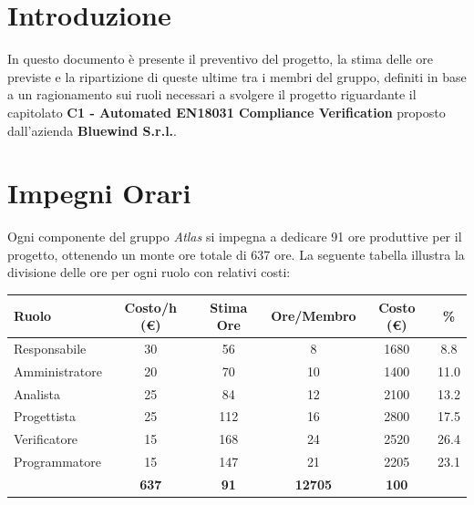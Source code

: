 \documentclass[a4paper,12pt]{article}
\begin{document}
\newpage

\tableofcontents

\newpage

\section{Introduzione}{
    In questo documento è presente il preventivo del progetto, la stima delle ore previste e la ripartizione di queste ultime tra i membri del gruppo, definiti in base a un ragionamento sui ruoli necessari a svolgere il progetto riguardante il capitolato \textbf{C1 - Automated EN18031 Compliance Verification} proposto dall'azienda \textbf{Bluewind S.r.l.}.
}

\section{Impegni Orari}{
    Ogni componente del gruppo \textit{Atlas} si impegna a dedicare 91 ore produttive per il progetto, ottenendo un monte ore totale di 637 ore. 
    \newline La seguente tabella illustra la divisione delle ore per ogni ruolo con relativi costi:
    \begin{center}
        \begin{tabular}{|l|c|c|c|c|c|}
            \hline
            \rowcolor{gray!20}
            \textbf{Ruolo} & \textbf{Costo/h (€)} & \textbf{Stima Ore} & \textbf{Ore/Membro} & \textbf{Costo (€)} & \textbf{\%} \\
            \hline
            Responsabile & 30 & 56 & 8 & 1680 & 8.8 \\
            \hline
            Amministratore & 20 & 70 & 10 & 1400 & 11.0 \\
            \hline
            Analista & 25 & 84 & 12 & 2100 & 13.2 \\
            \hline
            Progettista & 25 & 112 & 16 & 2800 & 17.5 \\
            \hline
            Verificatore & 15 & 168 & 24 & 2520 & 26.4 \\
            \hline
            Programmatore & 15 & 147 & 21 & 2205 & 23.1 \\
            \hline
            \rowcolor{gray!20}
            \multicolumn{2}{|c|}{\textbf{Totale}} & \textbf{637} & \textbf{91} & \textbf{12705} & \textbf{100} \\
            \hline
        \end{tabular}


\end{center}}
\end{document}

